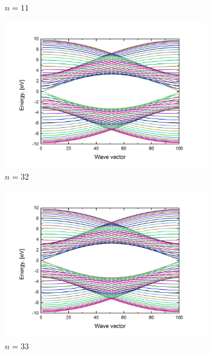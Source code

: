 \begin{figure}[hb!]
\begin{subfigure}{.5\textwidth}
  \caption{$n=11$}
  \label{fig:ac11}
\end{subfigure}
\begin{subfigure}{.5\textwidth}
  \centering
  \includegraphics[width=\linewidth]{img/ac_ribbon_32}
  \caption{$n=32$}
  \label{fig:ac32}
\end{subfigure}%
\begin{subfigure}{.5\textwidth}
  \centering
  \includegraphics[width=\linewidth]{img/ac_ribbon_33}
  \caption{$n=33$}
  \label{fig:ac33}
\end{subfigure}
\begin{subfigure}{.5\textwidth}
  \centering

\end{subfigure}
\end{figure}
